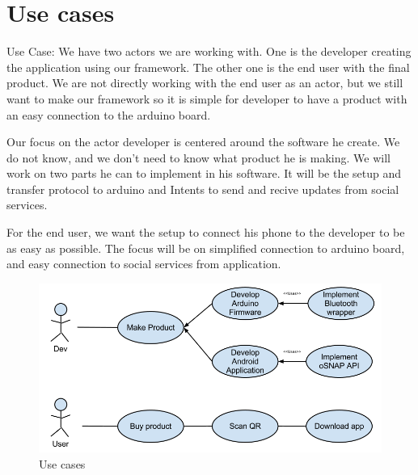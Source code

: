\section{Use cases}
Use Case:
We have two actors we are working with. One is the developer creating the application using our framework.
The other one is the end user with the final product. We are not directly working with the end user as an actor,
but we still want to make our framework so it is simple for developer to have a product with an easy connection to the arduino board.

Our focus on the actor developer is centered around the software he create. We do not know, and we don't need to
know what product he is making. We will work on two parts he can to implement in his software. It will be the setup and
transfer protocol to arduino and Intents to send and recive updates from social services.

For the end user, we want the setup to connect his phone to the developer to be as easy as possible. The focus will be on
simplified connection to arduino board, and easy connection to social services from application.

\begin{figure}[hb!]
\centering \includegraphics[scale=0.50]{img/use-cases.png}
\caption{Use cases}
\label{fig:architecture-usecases}
\end{figure}

